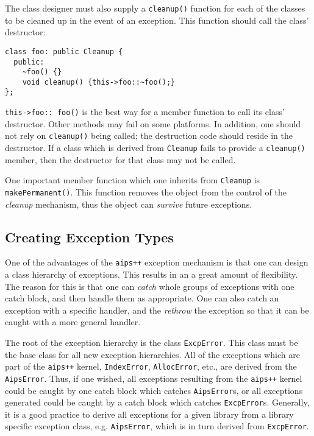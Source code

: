 The class designer must also supply a {\tt cleanup()} function for each
of the classes to be cleaned up in the event of an exception. This function
should call the class' destructor:
\begin{verbatim}
class foo: public Cleanup {
  public:
    ~foo() {}
    void cleanup() {this->foo::~foo();}
};
\end{verbatim}
\noindent
{\tt this->foo::~foo()} is the best way for a member function to call its
class' destructor. Other methods may fail on some platforms. In addition,
one should not rely on {\tt cleanup()} being called; the destruction code
should reside in the destructor. If a class which is derived from 
{\tt Cleanup} fails to provide a {\tt cleanup()} member, then the destructor
for that class may not be called.

One important member function which one inherits from {\tt Cleanup} is
{\tt makePermanent()}. This function removes the object from the control
of the {\em cleanup} mechanism, thus the object can {\em survive} future
exceptions. 

\subsection{Creating Exception Types}

One of the advantages of the {\tt aips++} exception mechanism is that one can
design a class hierarchy of exceptions. This results in an a great amount 
of flexibility. The reason for this is that one can {\em catch} whole groups 
of exceptions with one catch block, and then handle them as appropriate. One 
can also catch an exception with a specific handler, and the {\em rethrow} 
the exception so that it can be caught with a more general handler.

The root of the exception hierarchy is the class {\tt ExcpError}. This class
must be the base class for all new exception hierarchies. All of the exceptions
which are part of the {\tt aips++} kernel, {\tt IndexError}, {\tt AllocError},
etc., are derived from the {\tt AipsError}. Thus, if one wished, all 
exceptions resulting from the {\tt aips++} kernel could be caught by one catch
block which catches {\tt AipsError}s, or all exceptions generated could be 
caught by a catch block which catches {\tt ExcpError}s. Generally, it is a
good practice to derive all exceptions for a given library from a library
specific exception class, e.g. {\tt AipsError}, which is in turn derived 
from {\tt ExcpError}.

